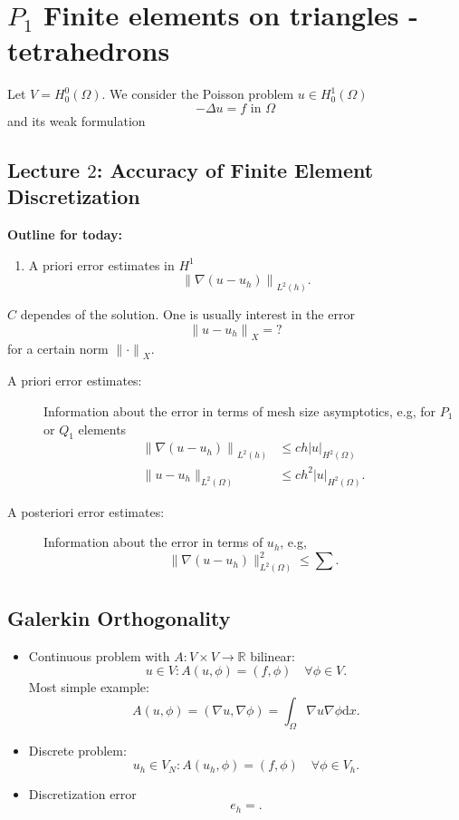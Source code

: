 \documentclass[
	a4paper,
	11pt,
	oneside
]{scrreprt}
\theoremstyle{definition}
\begin{document}
\chapter{$P_1$ Finite elements on triangles - tetrahedrons}

Let $V=H^{0}_{0}\left(\Omega\right)$. We consider the Poisson problem $u\in H^{1}_{0}\left(\Omega\right)$ \[-\Delta u=f\text{ in }\Omega \] and its weak formulation %

\section{Lecture $2$: Accuracy of Finite Element Discretization}

\textbf{Outline for today:}

\begin{enumerate}
	\item A priori error estimates in $H^{1}$ \[ {\|\nabla(u-u_{h})\|}_{L^{2}\left(h\right)}. \]
\end{enumerate}

$C$ dependes of the solution. One is usually interest in the error \[ {\|u-u_{h}\|}_{X}=? \] for a certain norm ${\|\cdot\|}_{X}$.

\begin{description}
	\item[A priori error estimates:] Information about the error in terms of mesh size asymptotics, e.g, for $P_{1}$ or $Q_{1}$ elements
	\begin{align*}
	{ \|\nabla\left(u-u_{h}\right)\|}_{L^{2}(h)}	&	\le ch{|u|}_{H^{2}(\Omega)} \\
	\|u-u_{h}\|_{L^{2}(\Omega)}										&	\le ch^{2}{|u|}_{H^2(\Omega)}.
	\end{align*}
	\item[A posteriori error estimates:] Information about the error in terms of $u_{h}$, e.g, \[ \|\nabla(u-u_{h})\|^{2}_{L^{2}(\Omega)}\le \sum_{}. \]
\end{description}

\section{Galerkin Orthogonality}

\begin{itemize}
	\item Continuous problem with $A\colon V\times V\rightarrow\mathbb{R}$ bilinear: \[ u\in V\colon A\left(u,\phi\right)=\left(f,\phi\right)\quad\forall\phi\in V. \] Most simple example: \[ A\left(u,\phi\right)=\left(\nabla u,\nabla\phi\right)=\int_{\Omega}\nabla u\nabla\phi\mathrm{d}x. \]
	\item Discrete problem: \[ u_{h}\in V_{N}\colon A\left(u_h,\phi\right)=\left(f,\phi\right)\quad\forall\phi\in V_{h}. \]
	\item Discretization error \[ e_{h}=. \]
\end{itemize}
\end{document}
